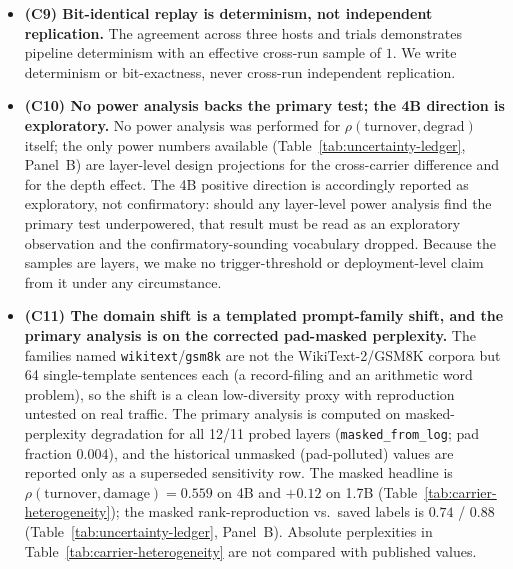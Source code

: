 \documentclass{article}
\begin{document}
\begin{itemize}
        testing whether the 4B depth structure reappears in a second domain (projected power
        $>0.8$, Panel~B), not pinning the sign flip. Those cells were not run (estimated
        0.5--1.5 GPU$\cdot$h, pending budget approval); the projected column of
        Table~\ref{tab:uncertainty-ledger} is analytic design planning only.
  \item \textbf{(C9) Bit-identical replay is determinism, not independent replication.} The
        agreement across three hosts and trials demonstrates pipeline determinism with an
        effective cross-run sample of $1$. We write determinism or bit-exactness, never
        cross-run independent replication.
  \item \textbf{(C10) No power analysis backs the primary test; the 4B direction is
        exploratory.} No power analysis was performed for
        $\rho(\mathrm{turnover},\mathrm{degrad})$ itself; the only power numbers available
        (Table~\ref{tab:uncertainty-ledger}, Panel~B) are layer-level design projections for the
        cross-carrier difference and for the depth effect. The 4B positive direction is
        accordingly reported as exploratory, not confirmatory: should any layer-level power
        analysis find the primary test underpowered, that result must be read as an exploratory
        observation and the confirmatory-sounding vocabulary dropped. Because the samples are
        layers, we make no trigger-threshold or deployment-level claim from it under any
        circumstance.
  \item \textbf{(C11) The domain shift is a templated prompt-family shift, and the primary
        analysis is on the corrected pad-masked perplexity.} The families named
        \texttt{wikitext}/\texttt{gsm8k} are not the WikiText-2/GSM8K corpora but 64 single-template
        sentences each (a record-filing and an arithmetic word problem), so the shift is a clean
        low-diversity proxy with reproduction untested on real traffic. The primary analysis is
        computed on masked-perplexity degradation for all 12/11 probed layers
        (\texttt{masked\_from\_log}; pad fraction $0.004$), and the historical unmasked
        (pad-polluted) values are reported only as a superseded sensitivity row. The masked
        headline is $\rho(\mathrm{turnover},\mathrm{damage})=0.559$ on 4B and
        $+0.12$ on 1.7B (Table~\ref{tab:carrier-heterogeneity}); the masked rank-reproduction vs.\
        saved labels is $0.74$ / $0.88$ (Table~\ref{tab:uncertainty-ledger}, Panel~B). Absolute
        perplexities in Table~\ref{tab:carrier-heterogeneity} are not compared with published values.

\end{itemize}
\end{document}
